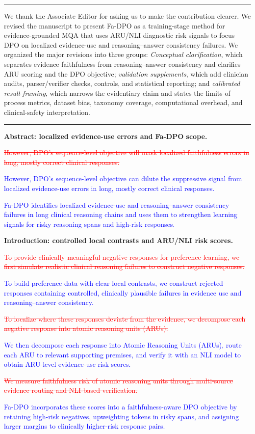 \documentclass[12pt]{article}
\newcommand{\deleted}[1]{\textcolor{red}{\sout{#1}}}
\newcommand{\added}[1]{\textcolor{blue}{#1}}
\newcommand{\responseheading}[1]{%
    \vspace{0.24cm}
    \par\noindent{\large\bfseries #1}\par
    \vspace{0.03cm}
    \noindent\rule{\linewidth}{0.35pt}\par
    \vspace{0.06cm}
    \noindent\ignorespaces
}
\begin{document}
\responseheading{Response and Revision Summary}
We thank the Associate Editor for asking us to make the contribution clearer. We
revised the manuscript to present Fa-DPO as a training-stage method for
evidence-grounded MQA that uses ARU/NLI diagnostic risk signals to focus DPO on
localized evidence-use and reasoning--answer consistency failures. We organized the
major revisions into three groups:
\emph{Conceptual clarification}, which separates evidence faithfulness from
reasoning--answer consistency and clarifies ARU scoring and the DPO objective;
\emph{validation supplements}, which add clinician audits, parser/verifier checks,
controls, and statistical reporting; and \emph{calibrated result framing}, which
narrows the evidentiary claim and states the limits of process metrics, dataset
bias, taxonomy coverage, computational overhead, and clinical-safety interpretation.


\responseheading{Revision Details}
\textbf{Abstract: localized evidence-use errors and Fa-DPO scope.}
\begin{displayquote}
\deleted{However, DPO's sequence-level objective will mask localized faithfulness errors in long, mostly correct clinical responses.}

\added{However, DPO's sequence-level objective can dilute the suppressive signal from localized evidence-use errors in long, mostly correct clinical responses.}

\added{Fa-DPO identifies localized evidence-use and reasoning--answer consistency failures in long clinical reasoning chains and uses them to strengthen learning signals for risky reasoning spans and high-risk responses.}
\end{displayquote}

\textbf{Introduction: controlled local contrasts and ARU/NLI risk scores.}

\begin{displayquote}
\deleted{To provide clinically meaningful negative responses for preference learning, we first simulate realistic clinical reasoning failures to construct negative responses.}

\added{To build preference data with clear local contrasts, we construct rejected responses containing controlled, clinically plausible failures in evidence use and reasoning--answer consistency.}

\deleted{To localize where these responses deviate from the evidence, we decompose each negative response into atomic reasoning units (ARUs).}

\added{We then decompose each response into Atomic Reasoning Units (ARUs), route each ARU to relevant supporting premises, and verify it with an NLI model to obtain ARU-level evidence-use risk scores.}

\deleted{We measure faithfulness risk of atomic reasoning units through multi-source evidence routing and NLI-based verification.}

\added{Fa-DPO incorporates these scores into a faithfulness-aware DPO objective by retaining high-risk negatives, upweighting tokens in risky spans, and assigning larger margins to clinically higher-risk response pairs.}

\end{displayquote}
\end{document}

